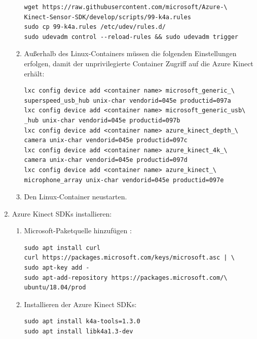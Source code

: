\begin{enumerate}[label*=\arabic*.]
\begin{enumerate}[label*=\arabic*.]
                \begin{lstlisting}[style=bash]
wget https://raw.githubusercontent.com/microsoft/Azure-\
Kinect-Sensor-SDK/develop/scripts/99-k4a.rules
sudo cp 99-k4a.rules /etc/udev/rules.d/
sudo udevadm control --reload-rules && sudo udevadm trigger
                \end{lstlisting}

            \item Außerhalb des Linux-Containers müssen die folgenden Einstellungen erfolgen, damit der unprivilegierte Container Zugriff auf die Azure Kinect erhält:
                \begin{lstlisting}[style=bash]
lxc config device add <container name> microsoft_generic_\
superspeed_usb_hub unix-char vendorid=045e productid=097a
lxc config device add <container name> microsoft_generic_usb\
_hub unix-char vendorid=045e productid=097b
lxc config device add <container name> azure_kinect_depth_\
camera unix-char vendorid=045e productid=097c
lxc config device add <container name> azure_kinect_4k_\
camera unix-char vendorid=045e productid=097d
lxc config device add <container name> azure_kinect_\
microphone_array unix-char vendorid=045e productid=097e
                \end{lstlisting}

            \item Den Linux-Container neustarten.
        \end{enumerate}

    \item Azure Kinect SDKs installieren:
        \begin{enumerate}[label*=\arabic*.]
            \item Microsoft-Paketquelle hinzufügen \cite{microsoftazure-kinect-sensor-sdk_installation_nodate}:
                \begin{lstlisting}[style=bash]
sudo apt install curl
curl https://packages.microsoft.com/keys/microsoft.asc | \
sudo apt-key add -
sudo apt-add-repository https://packages.microsoft.com/\
ubuntu/18.04/prod
                \end{lstlisting}

            \item Installieren der Azure Kinect SDKs:
                \begin{lstlisting}[style=bash]
sudo apt install k4a-tools=1.3.0
sudo apt install libk4a1.3-dev
                \end{lstlisting}


\end{enumerate}
\end{enumerate}
